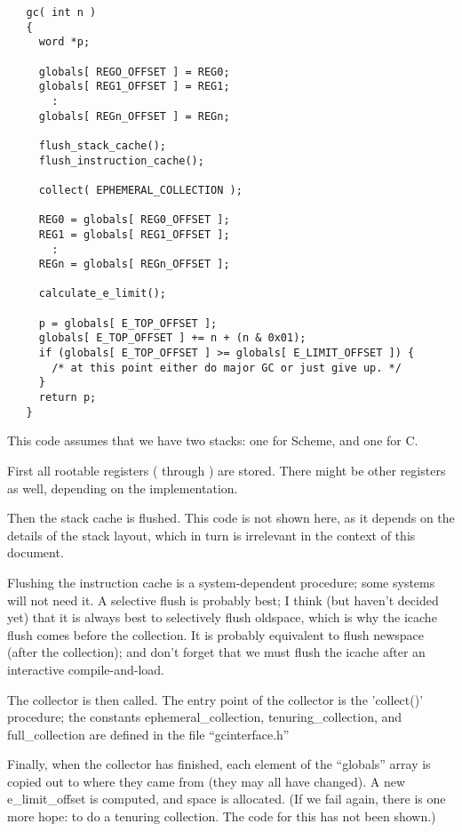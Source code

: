 \begin{minipage}{\linewidth}
\begin{verbatim}
   gc( int n )
   {
     word *p;

     globals[ REGO_OFFSET ] = REG0;
     globals[ REG1_OFFSET ] = REG1;
       :
     globals[ REGn_OFFSET ] = REGn;

     flush_stack_cache();
     flush_instruction_cache();

     collect( EPHEMERAL_COLLECTION );

     REG0 = globals[ REG0_OFFSET ];
     REG1 = globals[ REG1_OFFSET ];
       :
     REGn = globals[ REGn_OFFSET ];

     calculate_e_limit();

     p = globals[ E_TOP_OFFSET ];
     globals[ E_TOP_OFFSET ] += n + (n & 0x01);
     if (globals[ E_TOP_OFFSET ] >= globals[ E_LIMIT_OFFSET ]) {
       /* at this point either do major GC or just give up. */
     }
     return p;
   }
\end{verbatim}
\end{minipage}

This code assumes that we have two stacks: one for Scheme, and one for C.

First all rootable registers ( through ) are
stored.  There might be other registers as well, depending on the
implementation.

Then the stack cache is flushed. This code is not shown here, as it depends
on the details of the stack layout, which in turn is irrelevant in the
context of this document.

Flushing the instruction cache is a system-dependent procedure; some
systems will not need it. A selective flush is probably best; I think (but
haven't decided yet) that it is always best to selectively flush oldspace,
which is why the icache flush comes before the collection. It is probably
equivalent to flush newspace (after the collection); and don't forget that
we must flush the icache after an interactive compile-and-load.

The collector is then called. The entry point of the collector is the
'collect()' procedure; the constants {\sc ephemeral\_collection},
{\sc tenuring\_collection}, and {\sc full\_collection} are defined in the file
``gcinterface.h''

Finally, when the collector has finished, each element of the
``globals'' array is copied out to where they came from (they may all
have changed).  A new {\sc e\_limit\_offset} is computed, and space is
allocated. (If we fail again, there is one more hope: to do a tenuring
collection. The code for this has not been shown.)


